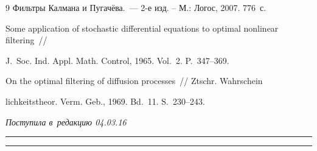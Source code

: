 {{\begin{thebibliography}{9}
Фильтры Калмана и Пугачёва.~--- 2-е изд. -- М.: Логос, 2007. 776~с.





Some application of stochastic differential equations to optimal nonlinear filtering~/\!\!/ 

J.~Soc. Ind. Appl. Math. Control, 1965. Vol.~2. P.~347--369.





On the optimal filtering of diffusion processes~/\!\!/ Ztschr. Wahrschein 

lichkeitstheor. Verm. Geb., 1969. Bd.~11. S.~230--243.

     \end{thebibliography}

} }





\vspace*{-3pt}



\hfill{\small\textit{Поступила в~редакцию 04.03.16}}









\vspace*{9pt}



\hrule



\vspace*{2pt}



\hrule










\def\tit{MODIFIED ELLIPSOIDAL SUBOPTIMAL FILTERS FOR~NONLINEAR STOCHASTIC

SYSTEMS ON~MANIFOLDS}



\def\titkol{Modified ellipsoidal suboptimal filters for~nonlinear stochastic

systems on manifolds}





